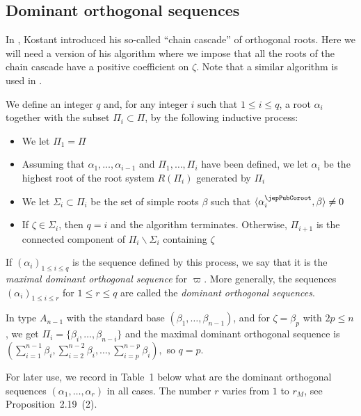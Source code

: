 \subsection{Dominant orthogonal sequences}
In \cite{jep93Kos12}, Kostant introduced his so-called ``chain cascade'' of orthogonal roots. Here we will need a version of his algorithm where we impose that all the roots of the chain cascade have a positive coefficient on $\zeta$. Note that a similar algorithm is used in \cite{jep93BM15}.

We define an integer $q$ and, for any integer $i$ such that $1\leqslant i\leqslant q$, a root $\alpha_i$ together with the subset $\Pi_i\subset\Pi$, by the following inductive process:
\begin{itemize}
\item We let $\Pi_1=\Pi$
\item Assuming that $\alpha_1,\ldots,\alpha_{i-1}$ and $\Pi_1,\ldots,\Pi_i$ have been defined, we let $\alpha_i$ be the highest root of the root system $R(\Pi_i)$ generated by $\Pi_i$
\item We let $\Sigma_i\subset\Pi_i$ be the set of simple roots $\beta$ such that $\langle\alpha_i^\jepPubCoroot,\beta\rangle\neq0$
\item If $\zeta\in\Sigma_i$, then $q=i$ and the algorithm terminates. Otherwise, $\Pi_{i+1}$ is the connected component of $\Pi_i\smallsetminus\Sigma_i$ containing $\zeta$
\end{itemize}
\begin{definition}
If $(\alpha_i)_{1\leqslant i\leqslant q}$ is the sequence defined by this process, we say that it is the \emph{maximal dominant orthogonal sequence} for $\varpi$. More generally, the sequences $(\alpha_i)_{1\leqslant i\leqslant r}$ for $1\leqslant r\leqslant q$ are called the \emph{dominant orthogonal sequences}.
\end{definition}
\begin{example}
In type $A_{n-1}$ with the standard base $(\beta_1,\ldots,\beta_{n-1})$, and for $\zeta=\beta_p$ with $2p\leqslant n$, we get $\Pi_i=\{\beta_i,\ldots,\beta_{n-i}\}$ and the maximal dominant orthogonal sequence is $(\sum_{i=1}^{n-1}\beta_i,\sum_{i=2}^{n-2}\beta_i,\ldots,\sum_{i=p}^{n-p}\beta_i),$ so $q=p$.
\end{example}
For later use, we record in Table~1 below what are the dominant orthogonal sequences $(\alpha_1,\ldots,\alpha_r)$ in all cases. The number $r$ varies from $1$ to $r_M$, see Proposition~2.19~(2).

